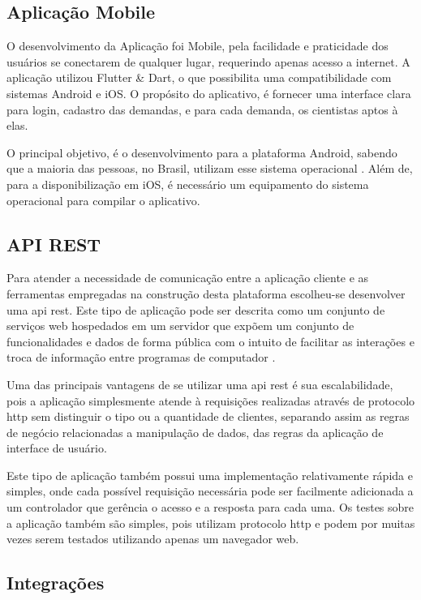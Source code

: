 \subsection{Aplicação Mobile}\label{subsec:app}

O desenvolvimento da Aplicação foi Mobile, pela facilidade e praticidade dos usuários se conectarem de qualquer lugar, requerindo apenas acesso a internet. A aplicação utilizou Flutter {\&} Dart, o que possibilita uma compatibilidade com sistemas Android e iOS. O propósito do aplicativo, é  fornecer uma interface clara para login, cadastro das demandas, e para cada demanda, os cientistas aptos à elas.

O principal objetivo, é o desenvolvimento para a plataforma Android, sabendo que a maioria das pessoas, no Brasil, utilizam esse sistema operacional \cite{StatCounter}. Além de, para a disponibilização em iOS, é necessário um equipamento do sistema operacional para compilar o aplicativo.

\subsection{API REST}\label{subsec:apirest}

Para atender a necessidade de comunicação entre a aplicação cliente e as ferramentas empregadas na construção desta plataforma escolheu-se desenvolver uma \gls{api} \gls{rest}. Este tipo de aplicação pode ser descrita como um conjunto de serviços web hospedados em um servidor que expõem um conjunto de funcionalidades e dados de forma pública com o intuito de facilitar as interações e troca de informação entre programas de computador \cite{RestApiBook}.

Uma das principais vantagens de se utilizar uma \gls{api} \gls{rest} é sua escalabilidade, pois a aplicação simplesmente atende à requisições realizadas através de protocolo \gls{http} sem distinguir o tipo ou a quantidade de clientes, separando assim as regras de negócio relacionadas a manipulação de dados, das regras da aplicação de interface de usuário.

Este tipo de aplicação também possui uma implementação relativamente rápida e simples, onde cada possível requisição necessária pode ser facilmente adicionada a um controlador que gerência o acesso e a resposta para cada uma. Os testes sobre a aplicação também são simples, pois utilizam protocolo \gls{http} e podem por muitas vezes serem testados utilizando apenas um navegador web.

\subsection{Integrações}\label{subsec:integrar}


